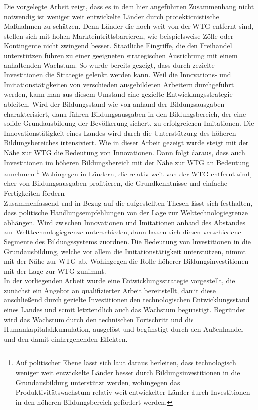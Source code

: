 Die vorgelegte Arbeit zeigt, dass es in dem hier angef{\"u}hrten Zusammenhang nicht notwendig ist weniger weit entwickelte L{\"a}nder durch protektionistische Ma{\ss}nahmen zu sch{\"u}tzen. Denn 
L{\"a}nder die noch weit von der WTG entfernt sind, stellen sich mit hohen Markteintrittsbarrieren, wie beispielsweise Z{\"o}lle oder Kontingente nicht zwingend besser. Staatliche Eingriffe, die den Freihandel unterst{\"u}tzen f{\"u}hren zu einer geeigneten strategischen Ausrichtung mit einem anhaltenden Wachstum. So wurde bereits gezeigt, dass durch gezielte Investitionen die Strategie gelenkt werden kann. Weil die Innovations- und Imitationst{\"a}tigkeiten von verschieden ausgebildeten Arbeitern durchgef{\"u}hrt werden, kann man aus diesem Umstand eine gezielte Entwicklungsstrategie ableiten. Wird der Bildungsstand wie von \citet{Benhabib.1994} anhand der Bildungsausgaben charakterisiert, dann f{\"u}hren Bildungsausgaben in den Bildungsbereich, der eine solide Grundausbildung der Bev{\"o}lkerung sichert, zu erfolgreichen Imitationen. Die Innovationst{\"a}tigkeit eines Landes wird durch die Unterst{\"u}tzung des h{\"o}heren Bildungsbereiches intensiviert. Wie in dieser Arbeit gezeigt wurde steigt mit der N{\"a}he zur WTG die Bedeutung von Innovationen. Dann folgt daraus, dass auch Investitionen im h{\"o}heren Bildungsbereich mit der N{\"a}he zur WTG an Bedeutung zunehmen.\footnote{Auf politischer Ebene l{\"a}sst sich laut \citet{Vandenbussche.2006} daraus herleiten, dass technologisch weniger weit entwickelte L{\"a}nder besser durch Bildungsinvestitionen in die Grundausbildung unterst{\"u}tzt werden, wohingegen das Produktivit{\"a}tswachstum relativ weit entwickelter L{\"a}nder durch Investitionen in den h{\"o}heren Bildungsbereich gef{\"o}rdert werden.}
Wohingegen in L{\"a}ndern, die relativ weit von der WTG entfernt sind, eher von Bildungsausgaben profitieren, die Grundkenntnisse und einfache Fertigkeiten f{\"o}rdern.\\


Zusammenfassend und in Bezug auf die aufgestellten Thesen l{\"a}sst sich festhalten, dass politische Handlungsempfehlungen von der Lage zur Welttechnologiegrenze abh{\"a}ngen. Wird zwischen Innovationen und Imitationen anhand des Abstandes zur Welttechnologiegrenze unterschieden, dann lassen sich diesen verschiedene Segmente des Bildungssystems zuordnen. Die Bedeutung von Investitionen in die Grundausbildung, welche vor allem die Imitationst{\"a}tigkeit unterst{\"u}tzen, nimmt mit der N{\"a}he zur WTG ab. Wohingegen die Rolle h{\"o}herer Bildungsinvestitionen mit der Lage zur WTG zunimmt.\\
In der vorliegenden Arbeit wurde eine Entwicklungsstrategie vorgestellt, die zun{\"a}chst ein Angebot an qualifizierter Arbeit bereitstellt, damit diese anschlie{\ss}end durch gezielte Investitionen den technologischen Entwicklungsstand eines Landes und somit letztendlich auch das Wachstum beg{\"u}nstigt. Begr{\"u}ndet wird das Wachstum durch den technischen Fortschritt und die Humankapitalakkumulation, ausgel{\"o}st und beg{\"u}nstigt durch den Au{\ss}enhandel und den damit einhergehenden Effekten.